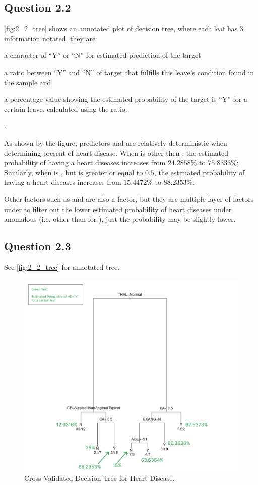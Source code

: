 \documentclass[parskip=full]{scrartcl}
\begin{document}
    \subsection*{Question 2.2}
    
    \autoref{fig:2_2_tree} shows an annotated plot of decision tree, where each leaf has 3 information notated, they are
    \begin{inparaenum}[(1)]
        \item a character of ``Y'' or ``N'' for estimated prediction of the target
        \item a ratio between ``Y'' and ``N'' of target that fulfills this leave's condition found in the sample and
        \item a percentage value showing the estimated probability of the target is ``Y'' for a certain leave, calculated using the ratio.
    \end{inparaenum}.

    As shown by the figure, predictors  and  are relatively deterministic when determining present of heart disease. When  is other then , the estimated probability of having a heart diseases increases from $24.2858\%$ to $75.8333\%$; Similarly, when  is , but  is greater or equal to $0.5$, the estimated probability of having a heart diseases increases from $15.4472\%$ to $88.2353\%$.
    
    Other factors such as  and  are also a factor, but they are multiple layer of factors under to filter out the lower estimated probability of heart diseases under anomalous  (i.e. other than  for ), just the probability may be slightly lower.
    
    \subsection*{Question 2.3}
    
    See \autoref{fig:2_2_tree} for annotated tree.

    \begin{figure}
        \centering
        \includegraphics[width=0.7\linewidth]{diagrams/annotated.png}
        \caption{Cross Validated Decision Tree for Heart Disease.}
        \label{fig:2_2_tree}
    \end{figure}
\end{document}
